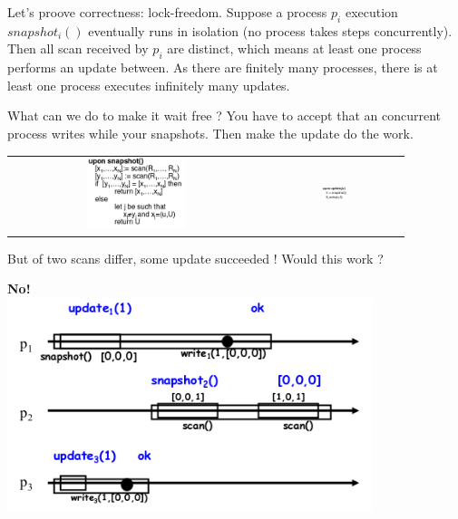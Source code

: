 \documentclass{article}
\theoremstyle{definition}
\begin{document}


Let's proove correctness: lock-freedom. Suppose a process $p_i$  execution $snapshot_i()$ eventually runs in isolation (no process takes steps concurrently). Then all scan received by $p_i$ are distinct, which means at least one process performs an update between. As there are finitely many processes, there is at least one process executes infinitely many updates.

What can we do to make it wait free ? You have to accept that an concurrent process writes while your snapshots. Then make the update do the work.

\begin{center}
\begin{tabular}{c c}
\includegraphics[width=0.4\textwidth]{code_gen_snap} &
\includegraphics[width=0.2\textwidth]{code_gen_upd} \vspace{\fill}
\end{tabular}
\end{center}

But of two scans differ, some update succeeded ! Would this work ?

\begin{center}
\large{\textbf{No!}}\\
\includegraphics[width=0.8\textwidth]{wait_free_snap_lin}\\
\end{center}
\end{document}
